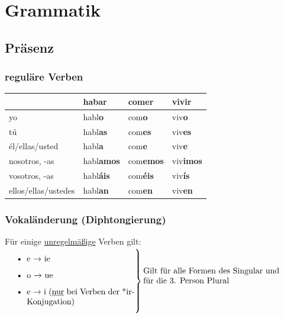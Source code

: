 \documentclass[10pt,spanish]{report}
\begin{document}
\chapter*{Grammatik}
\section*{Präsenz}
\subsection*{reguläre Verben}
\begin{longtable}{p{} | C{.10\textwidth}  | C{.10\textwidth}  | C{.10\textwidth}} 
\textbf{~}     & hab\textbf{ar} & com\textbf{er} & viv\textbf{ir}                                       \\ \hline
\hline
\endhead %
yo & habl\textbf{o} & com\textbf{o} & viv\textbf{o} \\
tú & habl\textbf{as} & com\textbf{es} &  viv\textbf{es} \\
él/ellas/usted &  habl\textbf{a} & com\textbf{e} &  viv\textbf{e} \\
nosotros, -as &  habl\textbf{amos} & com\textbf{emos} &  viv\textbf{imos} \\
vosotros, -as &  habl\textbf{áis} & com\textbf{éis} &  viv\textbf{ís} \\
ellos/ellas/ustedes &  habl\textbf{an} & com\textbf{en} &  viv\textbf{en} \\
\end{longtable}

\subsection*{Vokaländerung (Diphtongierung) }
Für einige \underline{unregelmäßige} Verben gilt:\\[2ex]
$
\left.\parbox{0.45\textwidth}{%
\begin{itemize}
  \item e $\rightarrow$ ie
  \item o $\rightarrow$ ue
  \item e $\rightarrow$ i (\underline{nur} bei Verben der *ir-Konjugation)
\end{itemize}
}\right\} \vbox{\noindent Gilt für alle Formen des Singular und\\für die 3. Person Plural}
$
\end{document}
